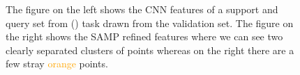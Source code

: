 \begin{figure}[h]
\begin{subfigure}[b]{0.4\textwidth}
     \end{subfigure}
     \caption{The figure on the left shows the CNN features of a support and query set from () task drawn from the \miniImagenet{} validation set. The figure on the right shows the SAMP refined features where we can see two clearly separated clusters of points whereas on the right there are a few stray \textcolor{orange}{orange} points.}
     \label{fig:samp-val-emb-plots}
\end{figure}
